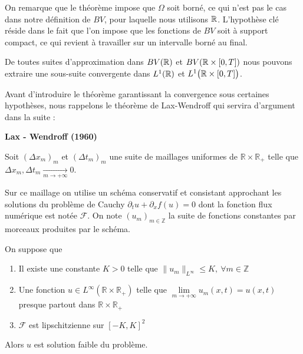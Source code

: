 On remarque que le théorème impose que $\Omega$ soit borné, ce qui n'est pas le cas dans notre définition de $BV$, pour laquelle nous utilisons $\mathbb{R}$. L'hypothèse clé réside dans le fait que l'on impose que les fonctions de $BV$ soit à support compact, ce qui revient à travailler sur un intervalle borné au final.

De toutes suites d'approximation dans $BV(\mathbb{R})$ et $BV(\mathbb{R} \times [0,T])$ nous pouvons extraire une sous-suite convergente dans $L^1(\mathbb{R})$ et $L^1\big( \mathbb{R} \times [0,T]\big)$.

\vspace{1em}

Avant d'introduire le théorème garantissant la convergence sous certaines hypothèses, nous rappelons le théorème de Lax-Wendroff qui servira d'argument dans la  suite :

\begin{theorembox}
\begin{theorem}
    \textbf{Lax - Wendroff (1960)}

    Soit $(\Delta x_m)_m$ et $(\Delta t_m)_m$ une suite de maillages uniformes de $\mathbb{R}\times \mathbb{R}_+$ telle que $\Delta x_m, \Delta t_m \underset{m \to +\infty}{\longrightarrow} 0$.
    
    Sur ce maillage on utilise un schéma conservatif et consistant approchant les solutions du problème de Cauchy $\partial_t u + \partial_xf(u) = 0$ dont la fonction flux numérique est notée $\mathcal{F}$. 
    On note $(u_m)_{m \in \mathbb{Z}}$ la suite de fonctions constantes par morceaux produites par le schéma.

    On suppose que 
    \begin{enumerate}
        \item Il existe une constante $K >0$ telle que $\|u_m\|_{L^\infty} \leq K, \ \forall m \in \mathbb{Z}$
        \item Une fonction $u \in L^\infty(\mathbb{R}\times\mathbb{R_+})$ telle que $\underset{m \to +\infty}{\lim}u_m(x,t) = u(x,t)$ presque partout dans $\mathbb{R}\times \mathbb{R_+}$
        \item $\mathcal{F}$ est lipschitzienne sur $[-K,K]^2$
    \end{enumerate}

    \vspace{1em}

    Alors $u$ est solution faible du problème.
    
\end{theorem}
\end{theorembox}

